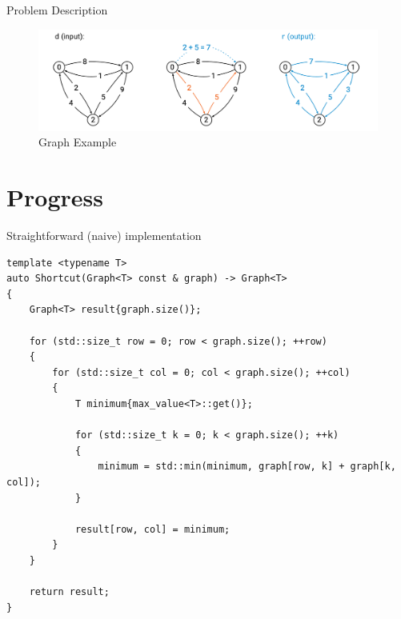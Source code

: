 \documentclass[british, svgnames, dvipsnames]{upb-beamer}
\newenvironment{codesnip}{\captionsetup{type=listing}\vspace{\intextsep}}{\vspace{\intextsep}} %
\begin{document}
\begin{frame}{Problem Description}
    \begin{figure}[h!]
        \centering
        \includegraphics[width=\linewidth]{img/graphs.png}
        \caption{Graph Example}
        \label{fig:graphs}
    \end{figure}
\end{frame}

\section{Progress}

\begin{frame}[fragile]{Straightforward (naive) implementation}
\begin{codesnip}
\begin{verbatim}
template <typename T>
auto Shortcut(Graph<T> const & graph) -> Graph<T>
{
    Graph<T> result{graph.size()};

    for (std::size_t row = 0; row < graph.size(); ++row)
    {
        for (std::size_t col = 0; col < graph.size(); ++col)
        {
            T minimum{max_value<T>::get()};
            
            for (std::size_t k = 0; k < graph.size(); ++k)
            {
                minimum = std::min(minimum, graph[row, k] + graph[k, col]);
            }

            result[row, col] = minimum;
        }
    }

    return result;
}
\end{verbatim} 
\caption{Naive C++ implementation}
\end{codesnip}
\end{frame}
\end{document}
